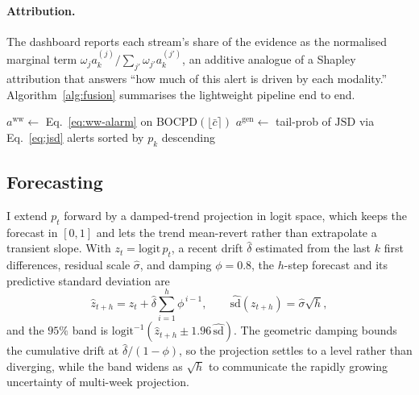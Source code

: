 \documentclass[10pt,twocolumn]{article}
\theoremstyle{definition}
\newcommand{\jsd}{\mathrm{JSD}}
\begin{document}
\paragraph{Attribution.}
The dashboard reports each stream's share of the evidence as the normalised
marginal term $\omega_j a^{(j)}_k / \sum_{j'}\omega_{j'}a^{(j')}_k$, an additive
analogue of a Shapley attribution that answers ``how much of this alert is driven
by each modality.'' Algorithm~\ref{alg:fusion} summarises the lightweight pipeline
end to end.

\begin{algorithm}[t]
\small
\caption{MOSAIC lightweight fusion (per cycle)}
\label{alg:fusion}
$a^{\mathrm{ww}}\leftarrow$ Eq.~\eqref{eq:ww-alarm} on BOCPD$(\lfloor\bar c\rceil)$\;
$a^{\mathrm{gen}}\leftarrow$ tail-prob of $\jsd$ via Eq.~\eqref{eq:jsd}\;
\Return alerts sorted by $p_k$ descending
\end{algorithm}

\subsection{Forecasting}
\label{sec:forecast}

I extend $p_t$ forward by a damped-trend projection \citep{gardner1985} in
logit space, which keeps the forecast in $[0,1]$ and lets the trend mean-revert
rather than extrapolate a transient slope. With $z_t=\mathrm{logit}\,p_t$, a
recent drift $\hat\delta$ estimated from the last $k$ first differences, residual
scale $\hat\sigma$, and damping $\phi=0.8$, the $h$-step forecast and its
predictive standard deviation are
\begin{equation}
\hat z_{t+h}=z_t+\hat\delta\sum_{i=1}^{h}\phi^{\,i-1},\qquad
\widehat{\mathrm{sd}}(z_{t+h})=\hat\sigma\sqrt{h},
\label{eq:forecast}
\end{equation}
and the $95\%$ band is $\mathrm{logit}^{-1}(\hat z_{t+h}\pm1.96\,\widehat{\mathrm{sd}})$.
The geometric damping bounds the cumulative drift at $\hat\delta/(1-\phi)$, so the
projection settles to a level rather than diverging, while the band widens as
$\sqrt h$ to communicate the rapidly growing uncertainty of multi-week
projection.
\end{document}
